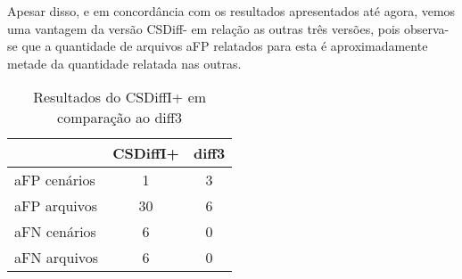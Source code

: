 Apesar disso, e em concordância com os resultados apresentados até agora, vemos uma vantagem da versão CSDiff- em relação as
outras três versões, pois observa-se que a quantidade de arquivos aFP relatados para esta é aproximadamente metade da
quantidade relatada nas outras.

\begin{table}[ht]
	\begin{center}
		\begin{tabular}{|l|c|c|}
			\hline
			\textbf{ }   & \textbf{CSDiffI+} & \textbf{diff3} \\
			\hline
			aFP cenários & 1                 & 3              \\
			aFP arquivos & 30                & 6              \\
			aFN cenários & 6                 & 0              \\
			aFN arquivos & 6                 & 0              \\
			\hline
		\end{tabular}
	\end{center}
	\caption{Resultados do CSDiffI+ em comparação ao diff3}\label{csdiff_indentation_plus_afp_afn}
\end{table}

